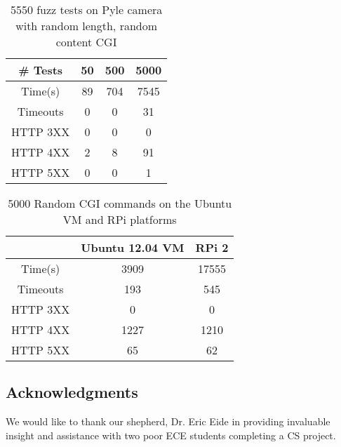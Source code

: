 \documentclass[letterpaper,twocolumn,10pt]{article}
\begin{document}
\begin{table}
\centering
	\begin{tabular}{ |c|c|c|c| }
		\hline
		\# Tests & 50 & 500 & 5000 \\
		\hline
		\hline
		Time(s) & 89 & 704 & 7545 \\
		Timeouts & 0 & 0 & 31  \\
		HTTP 3XX & 0 & 0 & 0 \\
		HTTP 4XX & 2 & 8 & 91 \\
		HTTP 5XX & 0 & 0 & 1 \\
		\hline
	\end{tabular}
	\caption{5550 fuzz tests on Pyle camera with random length, random content CGI}
	\label{tab:Pyle_Rand_CGI} 
\end{table}

\begin{table}[here]
\centering
	\begin{tabular}{ |c|c|c| }
		\hline
		~ & Ubuntu 12.04 VM & RPi 2\\
		\hline
		\hline
		Time(s) & 3909 & 17555 \\
		Timeouts & 193 & 545  \\
		HTTP 3XX & 0 & 0 \\
		HTTP 4XX & 1227 & 1210 \\
		HTTP 5XX & 65 & 62 \\
		\hline
	\end{tabular}
	\caption{5000 Random CGI commands on the Ubuntu VM and RPi platforms}
	\label{tab:VMvsPi} 
\end{table}





\subsection*{Acknowledgments}
We would like to thank our shepherd, Dr. Eric Eide in providing invaluable insight and assistance with two poor ECE students completing a CS project.

{\footnotesize 
}
\end{document}
